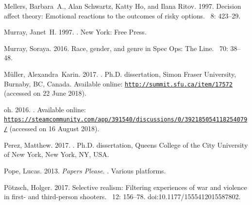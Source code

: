 \documentclass[arts,article,accept,moreauthors,pdftex,10pt,a4paper]{Definitions/mdpi}
\begin{document}
\begin{thebibliography}{999}
Mellers, Barbara~A., Alan Schwartz, Katty Ho, and Ilana Ritov. 1997.
\newblock Decision affect theory: Emotional reactions to the outcomes of risky
  options.
~{8\/}: 423--29.

Murray, Janet~H. 1997.
.
\newblock New York: Free Press.

Murray, Soraya. 2016.
\newblock Race, gender, and genre in {Spec Ops: The Line}.
~{70\/}: 38--48.

Müller, Alexandra~Karin. 2017.
.
\newblock Ph.D. dissertation, Simon Fraser University, Burnaby, BC, Canada.
\newblock Available online:
  \href{http://summit.sfu.ca/item/17572}{\nolinkurl{http://summit.sfu.ca/item/17572}}
  (accessed on 22 June 2018).

oh. 2016.%
.
\newblock Available online:
  \href{https://steamcommunity.com/app/391540/discussions/0/392185054118254079/}{\nolinkurl{https://steamcommunity.com/app/391540/discussions/0/392185054118254079/}}
  (accessed on 16 August 2018).

Perez, Matthew. 2017.
.
\newblock Ph.D. dissertation, Queens College of the City University of New York, New York, NY, USA.
\newblock 

Pope, Lucas. 2013.
\newblock \emph{Papers Please}.
.
\newblock Various platforms.

Pötzsch, Holger. 2017.
\newblock Selective realism: {F}iltering experiences of war and violence in
  first- and third-person shooters.
~{12\/}: 156--78.
\newblock
  doi:10.1177/1555412015587802.


\end{thebibliography}
\end{document}
